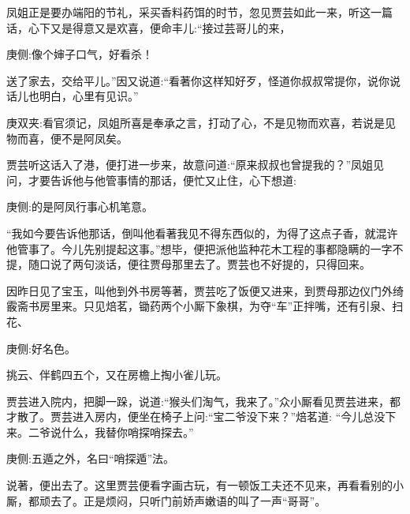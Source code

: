 \begin{parag}
    凤姐正是要办端阳的节礼，采买香料药饵的时节，忽见贾芸如此一来，听这一篇话，心下又是得意又是欢喜，便命丰儿:“接过芸哥儿的来，\begin{note}庚侧:像个婶子口气，好看杀！\end{note}送了家去，交给平儿。”因又说道:“看著你这样知好歹，怪道你叔叔常提你，说你说话儿也明白，心里有见识。”\begin{note}庚双夹:看官须记，凤姐所喜是奉承之言，打动了心，不是见物而欢喜，若说是见物而喜，便不是阿凤矣。\end{note}贾芸听这话入了港，便打进一步来，故意问道:“原来叔叔也曾提我的？”凤姐见问，才要告诉他与他管事情的那话，便忙又止住，心下想道:\begin{note}庚侧:的是阿凤行事心机笔意。\end{note}“我如今要告诉他那话，倒叫他看著我见不得东西似的，为得了这点子香，就混许他管事了。今儿先别提起这事。”想毕，便把派他监种花木工程的事都隐瞒的一字不提，随口说了两句淡话，便往贾母那里去了。贾芸也不好提的，只得回来。
\end{parag}


\begin{parag}
    因昨日见了宝玉，叫他到外书房等著，贾芸吃了饭便又进来，到贾母那边仪门外绮霰斋书房里来。只见焙茗，锄药两个小厮下象棋，为夺“车”正拌嘴，还有引泉、扫花、\begin{note}庚侧:好名色。\end{note}挑云、伴鹤四五个，又在房檐上掏小雀儿玩。
\end{parag}


\begin{parag}
    贾芸进入院内，把脚一跺，说道:“猴头们淘气，我来了。”众小厮看见贾芸进来，都才散了。贾芸进入房内，便坐在椅子上问:“宝二爷没下来？”焙茗道: “今儿总没下来。二爷说什么，我替你哨探哨探去。”\begin{note}庚侧:五遁之外，名曰“哨探遁”法。\end{note}说著，便出去了。这里贾芸便看字画古玩，有一顿饭工夫还不见来，再看看别的小厮，都顽去了。正是烦闷，只听门前娇声嫩语的叫了一声“哥哥”。
\end{parag}


